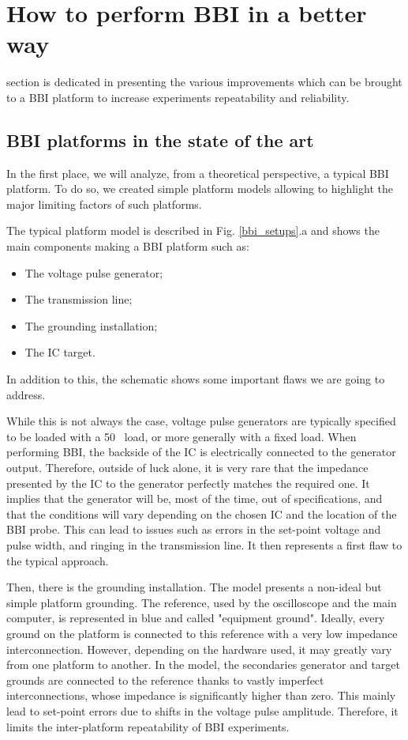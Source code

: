 
\section{How to perform BBI in a better way}
	 section is dedicated in presenting the various improvements which can be brought to a BBI platform to increase experiments repeatability and reliability.
	\subsection{BBI platforms in the state of the art}
		In the first place, we will analyze, from a theoretical perspective, a typical BBI platform.
		To do so, we created simple platform models allowing to highlight the major limiting factors of such platforms.
		
		The typical platform model is described in Fig. \ref{bbi_setups}.a and shows the main components making a BBI platform such as:
		\begin{itemize}
			\item The voltage pulse generator;
			\item The transmission line;
			\item The grounding installation;
			\item The IC target.
		\end{itemize}
		In addition to this, the schematic shows some important flaws we are going to address.

		While this is not always the case, voltage pulse generators are typically specified to be loaded with a 50 \textOmega\ load, or more generally with a fixed load.
		When performing BBI, the backside of the IC is electrically connected to the generator output.
		Therefore, outside of luck alone, it is very rare that the impedance presented by the IC to the generator perfectly matches the required one.
		It implies that the generator will be, most of the time, out of specifications, and that the conditions will vary depending on the chosen IC and the location of the BBI probe.
		This can lead to issues such as errors in the set-point voltage and pulse width, and ringing in the transmission line.
		It then represents a first flaw to the typical approach.

		Then, there is the grounding installation.
		The model presents a non-ideal but simple platform grounding.
		The reference, used by the oscilloscope and the main computer, is represented in blue and called "equipment ground".
		Ideally, every ground on the platform is connected to this reference with a very low impedance interconnection.
		However, depending on the hardware used, it may greatly vary from one platform to another.
		In the model, the secondaries generator and target grounds are connected to the reference thanks to vastly imperfect interconnections, whose impedance is significantly higher than zero.
		This mainly lead to set-point errors due to shifts in the voltage pulse amplitude.
		Therefore, it limits the inter-platform repeatability of BBI experiments.

